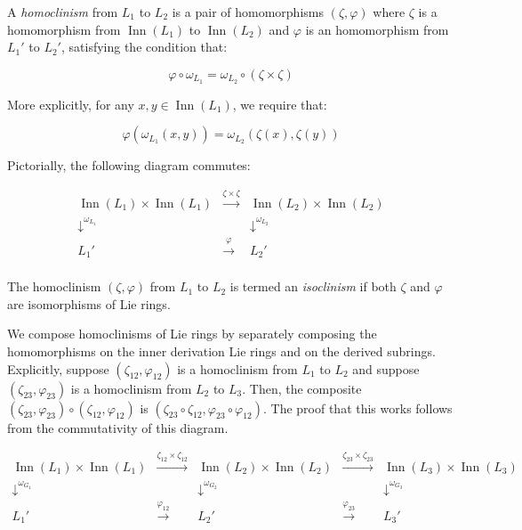 A {\em homoclinism} from $L_1$ to $L_2$ is a pair of homomorphisms
$(\zeta,\varphi)$ where $\zeta$ is a homomorphism from
$\operatorname{Inn}(L_1)$ to $\operatorname{Inn}(L_2)$ and $\varphi$ is an
homomorphism from $L_1'$ to $L_2'$, satisfying the condition that:

$$\varphi \circ \omega_{L_1} = \omega_{L_2} \circ (\zeta \times \zeta)$$

More explicitly, for any $x,y \in \operatorname{Inn}(L_1)$, we require that:

$$\varphi(\omega_{L_1}(x,y)) = \omega_{L_2}(\zeta(x),\zeta(y))$$

Pictorially, the following diagram commutes:

$$\begin{array}{ccc}
  \operatorname{Inn}(L_1) \times \operatorname{Inn}(L_1) & \stackrel{\zeta \times \zeta}{\to} & \operatorname{Inn}(L_2) \times \operatorname{Inn}(L_2) \\
  \downarrow^{\omega_{L_1}}  & & \downarrow^{\omega_{L_2}}\\
  L_1' & \stackrel{\varphi}{\to} & L_2'\\
\end{array}$$

The homoclinism $(\zeta,\varphi)$ from $L_1$ to $L_2$ is termed an
{\em isoclinism} if both $\zeta$ and $\varphi$ are isomorphisms of Lie
rings.

We compose homoclinisms of Lie rings by separately composing the
homomorphisms on the inner derivation Lie rings and on the derived
subrings. Explicitly, suppose $(\zeta_{12},\varphi_{12})$ is a
homoclinism from $L_1$ to $L_2$ and suppose
$(\zeta_{23},\varphi_{23})$ is a homoclinism from $L_2$ to
$L_3$. Then, the composite $(\zeta_{23},\varphi_{23}) \circ
(\zeta_{12}, \varphi_{12})$ is $(\zeta_{23} \circ \zeta_{12},
\varphi_{23} \circ \varphi_{12})$. The proof that this works follows
from the commutativity of this diagram.

$$\begin{array}{ccccc}
  \operatorname{Inn}(L_1) \times \operatorname{Inn}(L_1) & \stackrel{\zeta_{12} \times \zeta_{12}}{\to} & \operatorname{Inn}(L_2) \times \operatorname{Inn}(L_2) & \stackrel{\zeta_{23} \times \zeta_{23}}{\to} & \operatorname{Inn}(L_3) \times \operatorname{Inn}(L_3)\\
  \downarrow^{\omega_{G_1}}  & & \downarrow^{\omega_{G_2}} & & \downarrow^{\omega_{G_3}}\\
  L_1' & \stackrel{\varphi_{12}}{\to} & L_2' & \stackrel{\varphi_{23}}{\to} & L_3'\\
\end{array}$$

